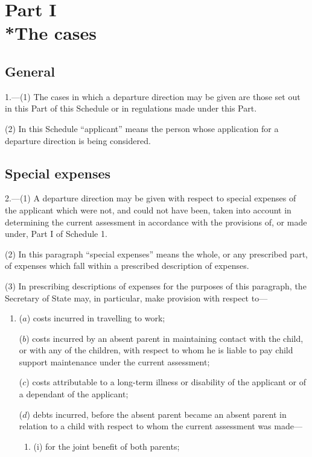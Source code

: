 \documentclass[a4paper]{article}
\begin{document}
{

\section[Part I --- The cases]{Part I\\*The cases}

\renewcommand\parthead{--- Schedule 4B Part I}

\subsection*{General}

1.—(1) The cases in which a departure direction may be given are those set out in this Part of this Schedule or in regulations made under this Part.

(2) In this Schedule “applicant” means the person whose application for a departure direction is being considered.

\subsection*{Special expenses}

2.—(1) A departure direction may be given with respect to special expenses of the applicant which were not, and could not have been, taken into account in determining the current assessment in accordance with the provisions of, or made under, Part I of Schedule 1.

(2)
In this paragraph “special expenses” means the whole, or any prescribed part, of expenses which fall within a prescribed description of expenses.

(3)
In prescribing descriptions of expenses for the purposes of this paragraph, the Secretary of State may, in particular, make provision with respect to---
\begin{enumerate}\item[]
($a$) costs incurred in travelling to work;

($b$) costs incurred by an absent parent in maintaining contact with the child, or
with any of the children, with respect to whom he is liable to pay child
support maintenance under the current assessment;

($c$) costs attributable to a long-term illness or disability of the applicant or of a
dependant of the applicant;

($d$) debts incurred, before the absent parent became an absent parent in relation
to a child with respect to whom the current assessment was made---
\begin{enumerate}\item[]
(i)
for the joint benefit of both parents;


\end{enumerate}
\end{enumerate}}
\end{document}
